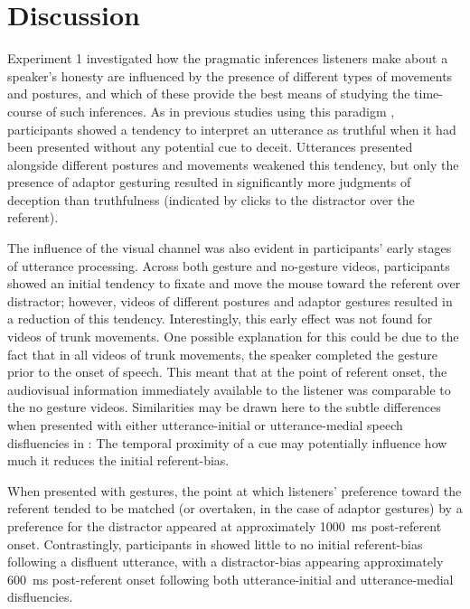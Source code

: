 \documentclass[a4paper,man,natbib]{apa6}
\begin{document}
\section{Discussion}
Experiment 1 investigated how the pragmatic inferences listeners make about a speaker's honesty are influenced by the presence of different types of movements and postures, and which of these provide the best means of studying the time-course of such inferences.
As in previous studies using this paradigm \citep{Loy2017, King2018}, participants showed a tendency to interpret an utterance as truthful when it had been presented without any potential cue to deceit.
Utterances presented alongside different postures and movements weakened this tendency, but only the presence of adaptor gesturing resulted in significantly more judgments of deception than truthfulness (indicated by clicks to the distractor over the referent).

The influence of the visual channel was also evident in participants' early stages of utterance processing. 
Across both gesture and no-gesture videos, participants showed an initial tendency to fixate and move the mouse toward the referent over distractor; however, videos of different postures and adaptor gestures resulted in a reduction of this tendency.
Interestingly, this early effect was not found for videos of trunk movements.
One possible explanation for this could be due to the fact that in all videos of trunk movements, the speaker completed the gesture prior to the onset of speech.
This meant that at the point of referent onset, the audiovisual information immediately available to the listener was comparable to the no gesture videos. 
Similarities may be drawn here to the subtle differences when presented with either utterance-initial or utterance-medial speech disfluencies in \citet{Loy2017}: The temporal proximity of a cue may potentially influence how much it reduces the initial referent-bias. 

When presented with gestures, the point at which listeners' preference toward the referent tended to be matched (or overtaken, in the case of adaptor gestures) by a preference for the distractor appeared at approximately 1000~ms post-referent onset. 
Contrastingly, participants in \citeauthor{Loy2017} showed little to no initial referent-bias following a disfluent utterance, with a distractor-bias appearing approximately 600~ms post-referent onset following both utterance-initial and utterance-medial disfluencies. 
\end{document}
